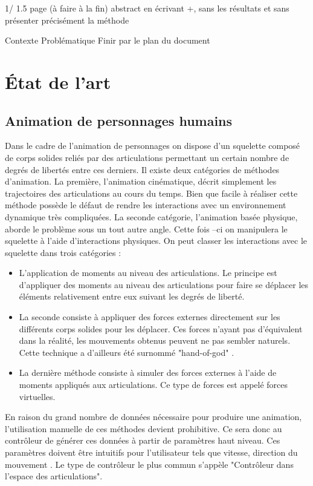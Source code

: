 \documentclass{llncs}
\begin{document}
1/ 1.5 page (à faire à la fin) abstract en écrivant +, sans les résultats et sans présenter précisément la méthode


Contexte
Problématique
Finir par le plan du document


%
\section{État de l'art}
%
\subsection{Animation de personnages humains} 
Dans le cadre de l'animation de personnages on dispose d'un squelette composé de corps solides reliés par des articulations permettant un certain nombre de degrés de libertés entre ces derniers. Il existe deux catégories de méthodes d'animation. La première, l'animation cinématique, décrit simplement les trajectoires des articulations au cours du temps. Bien que facile à réaliser cette méthode possède le défaut de rendre les interactions avec un environnement dynamique très compliquées. La seconde catégorie, l'animation basée physique, aborde le problème sous un tout autre angle. Cette fois –ci on manipulera le squelette à l'aide d'interactions physiques. On peut classer les interactions avec le squelette dans trois catégories \cite{geijtenbeek2012interactive}: \newline
\begin{itemize}
\item{L'application de moments au niveau des articulations. Le principe est d'appliquer des moments au niveau des articulations pour faire se déplacer les éléments relativement entre eux suivant les degrés de liberté.}
\item{La seconde consiste à appliquer des forces externes directement sur les différents corps solides pour les déplacer. Ces forces n'ayant pas d'équivalent dans la réalité, les mouvements obtenus peuvent ne pas sembler naturels. Cette technique a d'ailleurs été surnommé "hand-of-god" \cite{van1995guided}. }
\item{La dernière méthode consiste à simuler des forces externes à l'aide de moments appliqués aux articulations. Ce type de forces est appelé forces virtuelles.}
\end{itemize}

En raison du grand nombre de données nécessaire pour produire une animation, l'utilisation manuelle de ces méthodes devient prohibitive. Ce sera donc au contrôleur de générer ces données à partir de paramètres haut niveau. Ces paramètres doivent être intuitifs pour l'utilisateur tels que vitesse, direction du mouvement \cite{coros2010generalized}. Le type de contrôleur le plus commun s'appèle "Contrôleur dans l'espace des articulations".
\end{document}
